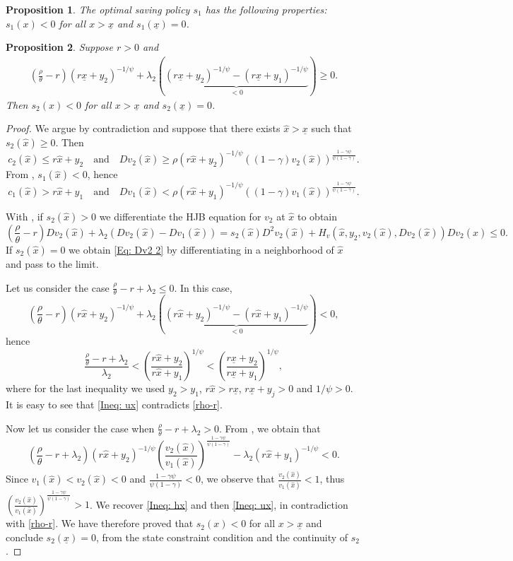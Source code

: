 \documentclass[10pt,a4paper]{amsart}
\newtheorem{prop}{Proposition}
\newcommand{\beq}{\begin{equation}}
\newcommand{\eeq}{\end{equation}}
\newcommand{\g}{\gamma}
\newcommand{\hx}{\hat{x}}
\newcommand{\lc}{\left(}
\newcommand{\p}{\psi}
\newcommand{\rc}{\right)}
\newcommand{\ux}{{\underline x}}
\begin{document}
\begin{prop}\label{Prop: s1<0}
The optimal saving policy $s_1$ has the following properties: $s_1(x)< 0$ for all $x> \ux$ and $s_1(\ux)=0$. 
\end{prop}

\begin{prop}\label{Prop:s2boundary}
Suppose $r>0$ and 
\beq\label{rho-r}
\begin{aligned}
\lc \frac{\rho}{\theta}-r\rc(r\ux+y_2)^{-1/\psi}+\lambda_2\lc \underbrace{(r\ux+y_2)^{-1/\psi}-(r\ux+y_1)^{-1/\psi}}_{<0}\rc\geq 0.
\end{aligned}
\eeq
Then $s_2(x)<0$ for all $x>\ux$ and $s_2(\ux)=0$. 
\end{prop}

\begin{proof}
We argue by contradiction and suppose that there exists $\hx>\ux$ such that $s_2(\hx)\geq 0$. Then 
$$
c_2(\hx)\leq r\hx+y_2\quad {\text{and}}\quad Dv_2(\hx)\geq \rho(r\hx+y_2)^{-1/\psi}((1-\g)v_2(\hx))^{\frac{1-\g \psi}{\psi(1-\g)}}. 
$$
From , $s_1(\hx)<0$, hence
$$
c_1(\hx)>r\hx+y_1\quad {\text{and}}\quad Dv_1(\hx)<\rho(r\hx+y_1)^{-1/\psi}((1-\g)v_1(\hx))^{\frac{1-\g \psi}{\psi(1-\g)}}. 
$$

With , if $s_2(\hx)> 0$ we differentiate the HJB equation for $v_2$ at $\hx$ to obtain
\beq\label{Eq: Dv2 2}
\lc \frac{\rho}{\theta}-r\rc Dv_2(\hx)+\lambda_2\lc Dv_2(\hx)-Dv_1(\hx)\rc=s_2(\hx)D^2v_2(\hx)+H_v(\hx,y_2,v_2(\hx),Dv_2(\hx))Dv_2(\hx)\leq 0.
\eeq
{If $s_2(\hx)=0$ we obtain \cref{Eq: Dv2 2} by differentiating in a neighborhood of $\hx$ and pass to the limit.}\par
{Let us consider the case $\frac{\rho}{\theta}-r+\lambda_2 \leq 0$. In this case,}
\beq\label{Ineq: hx}
\lc \frac{\rho}{\theta}-r\rc(r\hx+y_2)^{-1/\psi}+\lambda_2\lc \underbrace{(r\hx+y_2)^{-1/\psi}-(r\hx+y_1)^{-1/\psi}}_{<0}\rc< 0,
\eeq
hence
\beq\label{Ineq: ux}
\frac{\frac{\rho}{\theta}-r+\lambda_2}{\lambda_2}<\lc \frac{r\hx+y_2}{r\hx+y_1}\rc^{1/\p}<\lc \frac{r\ux+y_2}{r\ux+y_1}\rc^{1/\p},
\eeq
where for the last inequality we used $y_2>y_1$, $r\hx>r\ux$, $r\ux+y_j>0$ and $1/\p>0$. It is easy to see that \eqref{Ineq: ux} contradicts \eqref{rho-r}. \par
Now let us consider the case when $\frac{\rho}{\theta}-r+\lambda_2 > 0$. From , we obtain that
$$
\lc \frac{\rho}{\theta}-r+\lambda_2 \rc (r\hx+y_2)^{-1/\psi}\lc\frac{v_2(\hx)}{v_1(\hx)}\rc^{\frac{1-\g \psi}{\psi(1-\g)}}-\lambda_2 (r\hx+y_1)^{-1/\psi}<0.
$$
Since $v_1(\hx)<v_2(\hx)<0$ and $\frac{1-\g \psi}{\psi(1-\g)}<0$, we observe that
$
\frac{v_2(\hx)}{v_1(\hx)}<1$, thus
$ \lc\frac{v_2(\hx)}{v_1(\hx)}\rc^{\frac{1-\g \psi}{\psi(1-\g)}}>1$.
We recover \eqref{Ineq: hx} and then \eqref{Ineq: ux}, in contradiction with \eqref{rho-r}. We have therefore proved that $s_2(x)<0$ for all $x>\ux$ and conclude $s_2(\ux)=0$, from the state constraint condition and the continuity of $s_2$. 
\end{proof}
\end{document}
